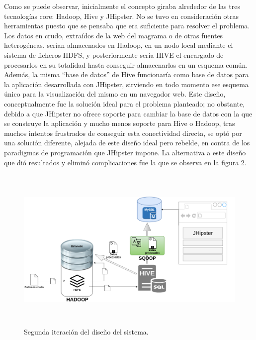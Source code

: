 Como se puede observar, inicialmente el concepto giraba alrededor de las tres tecnologías core: Hadoop, Hive y JHipster. No se tuvo en consideración otras herramientas puesto que se pensaba que era suficiente para resolver el problema. Los datos en crudo, extraídos de la web del magrama o de otras fuentes heterogéneas, serían almacenados en Hadoop, en un nodo local mediante el sistema de ficheros HDFS, y posteriormente sería HIVE el encargado de procesarlos en su totalidad hasta conseguir almacenarlos en un esquema común. Además, la misma “base de datos” de Hive funcionaría como base de datos para la aplicación desarrollada con JHipster, sirviendo en todo momento ese esquema único para la visualización del mismo en un navegador web. Este diseño, conceptualmente fue la solución ideal para el problema planteado; no obstante, debido a que JHipster no ofrece soporte para cambiar la base de datos con la que se construye la aplicación y mucho menos soporte para Hive o Hadoop, tras muchos intentos frustrados de conseguir esta conectividad directa, se optó por una solución diferente, alejada de este diseño ideal pero rebelde, en contra de los paradigmas de programación que JHipster impone. La alternativa a este diseño que dió resultados y eliminó complicaciones fue la que se observa en la figura 2. \par


\begin{figure}[!h]
    \centering
    \includegraphics[width=1\textwidth,height=8cm]{Imagenes/Dis_Fig_2}
    \caption{Segunda iteración del diseño del sistema.}
    \label{fig:dis_2_sist}
\end{figure}
\par


